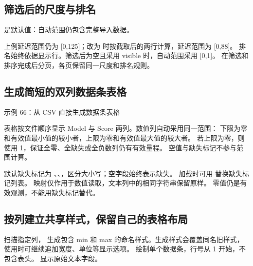 \subsection{筛选后的尺度与排名}
 是默认值：自动范围仍包含完整导入数据。

上例延迟范围仍为 [0,125]；改为  时按截取后的两行计算，延迟范围为 [0,88]。
排名始终依据显示行。筛选后为空且采用 visible 时，自动范围采用 [0,1]。
 在筛选和排序完成后分页，各页保留同一尺度和排名规则。

\subsection{生成简短的双列数据条表格}
\begin{example}[text and listing,sidebyside=false]{示例 66：从 CSV 直接生成数据条表格}
\end{example}

表格按文件顺序显示 Model 与 Score 两列。数值列自动采用同一范围：
下限为零和有效值最小值的较小者，上限为零和有效值最大值的较大者。
若上限为零，则使用 1，保证全零、全缺失或全负数列仍有有效量程。
空值与缺失标记不参与范围计算。

默认缺失标记为 、、，区分大小写；空字段始终表示缺失。
加载时可用  替换缺失标记列表。
映射仅作用于数值读取，文本列中的相同字符串保留原样。
零值仍是有效观测，不能用缺失标记替代。


\clearpage
\subsection{按列建立共享样式，保留自己的表格布局}
 扫描指定列，
生成包含 min 和 max 的命名样式。生成样式会覆盖同名旧样式，
使用时可继续追加宽度、单位等显示选项。
 绘制单个数据条，行号从 1 开始，不包含表头。
 显示原始文本字段。

